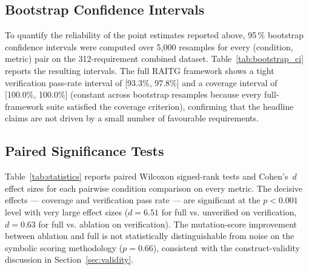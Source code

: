 \documentclass[conference]{IEEEtran}
\begin{document}
\subsection{Bootstrap Confidence Intervals}

To quantify the reliability of the point estimates reported above, 95\,\% bootstrap confidence intervals were computed over 5{,}000 resamples for every (condition, metric) pair on the 312-requirement combined dataset. Table~\ref{tab:bootstrap_ci} reports the resulting intervals. The full RAITG framework shows a tight verification pass-rate interval of [93.3\%, 97.8\%] and a coverage interval of [100.0\%, 100.0\%] (constant across bootstrap resamples because every full-framework suite satisfied the coverage criterion), confirming that the headline claims are not driven by a small number of favourable requirements.

\begin{table}[!t]
\centering
\caption{Bootstrap 95\,\% confidence intervals (5{,}000 resamples)}
\label{tab:bootstrap_ci}


\end{table}

\subsection{Paired Significance Tests}

Table~\ref{tab:statistics} reports paired Wilcoxon signed-rank tests and Cohen's~$d$ effect sizes for each pairwise condition comparison on every metric. The decisive effects --- coverage and verification pass rate --- are significant at the $p < 0.001$ level with very large effect sizes ($d = 6.51$ for full vs. unverified on verification, $d = 0.63$ for full vs. ablation on verification). The mutation-score improvement between ablation and full is not statistically distinguishable from noise on the symbolic scoring methodology ($p = 0.66$), consistent with the construct-validity discussion in Section~\ref{sec:validity}.

\begin{table}[!t]
\centering
\caption{Pairwise Wilcoxon signed-rank + Cohen's $d$ (n = 312 per condition)}
\label{tab:statistics}


\end{table}
\end{document}
